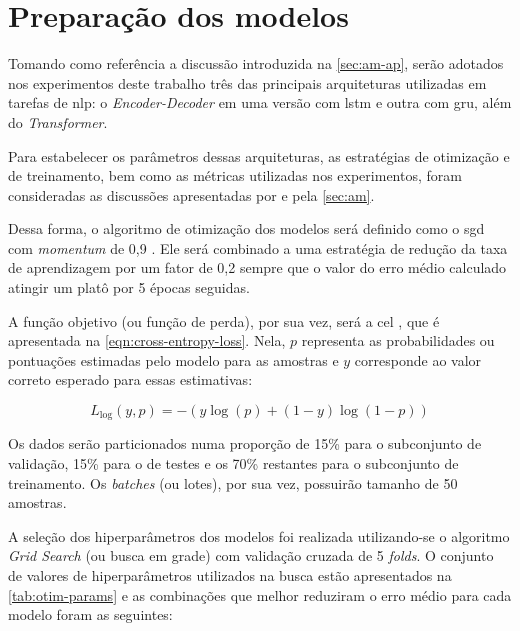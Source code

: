\section{Preparação dos modelos}
\label{sec:metodos-preparacao-modelos}


Tomando como referência a discussão introduzida na \autoref{sec:am-ap}, serão adotados nos experimentos deste trabalho três das principais arquiteturas utilizadas em tarefas de \acrfull{nlp}: o \textit{Encoder-Decoder} em uma versão com \acrfull{lstm} e outra com \acrfull{gru}, além do \textit{Transformer}.

Para estabelecer os parâmetros dessas arquiteturas, as estratégias de otimização e de treinamento, bem como as métricas utilizadas nos experimentos, foram consideradas as discussões apresentadas por  e pela \autoref{sec:am}.

Dessa forma, o algoritmo de otimização dos modelos será definido como o \acrfull{sgd} com \textit{momentum} de 0,9 \cite{robbins-2007-stochastic}. Ele será combinado a uma estratégia de redução da taxa de aprendizagem por um fator de 0,2 sempre que o valor do erro médio calculado atingir um platô por 5 épocas seguidas.

A função objetivo (ou função de perda), por sua vez, será a \acrfull{cel} \cite{mitchell-1997-ml}, que é apresentada na \autoref{eqn:cross-entropy-loss}. Nela, \(p\) representa as probabilidades ou pontuações estimadas pelo modelo para as amostras e \(y\) corresponde ao valor correto esperado para essas estimativas:

\begin{equation}
    \label{eqn:cross-entropy-loss}
    L_{\log}(y, p) = -(y \log (p) + (1 - y) \log (1 - p))
\end{equation}


Os dados serão particionados numa proporção de 15\% para o subconjunto de validação, 15\% para o de testes e os 70\% restantes para o subconjunto de treinamento. Os \textit{batches} (ou lotes), por sua vez, possuirão tamanho de 50 amostras.



A seleção dos hiperparâmetros dos modelos foi realizada utilizando-se o algoritmo \textit{Grid Search} (ou busca em grade) com validação cruzada de 5 \textit{folds}. O conjunto de valores de hiperparâmetros utilizados na busca estão apresentados na \autoref{tab:otim-params} e as combinações que melhor reduziram o erro médio para cada modelo foram as seguintes:

